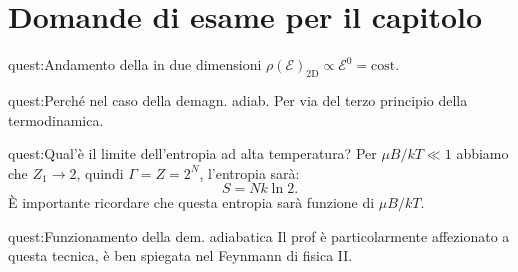 \clearpage
\section*{Domande di esame per il capitolo}%
\begin{quest}{quest:Andamento della in due dimensioni}
    $\rho (\mathcal{E}) _\text{2D} \propto  \mathcal{E}^0 = \text{cost}$.
\end{quest}
\begin{quest}{quest:Perché nel caso della demagn. adiab. }
Per via del terzo principio della termodinamica.
\end{quest}
\begin{quest}{quest:Qual'è il limite dell'entropia ad alta temperatura?}
Per $\mu B /kT \ll 1$ abbiamo che $Z_1\to 2$, quindi $\Gamma  = Z = 2^N$, l'entropia sarà:
\[
    S = N k\ln 2
.\] 
È importante ricordare che questa entropia sarà funzione di $\mu B /kT$.
\end{quest}
\begin{quest}{quest:Funzionamento della dem. adiabatica}
    Il prof è particolarmente affezionato a questa tecnica, è ben spiegata nel Feynmann di fisica II.
\end{quest}




